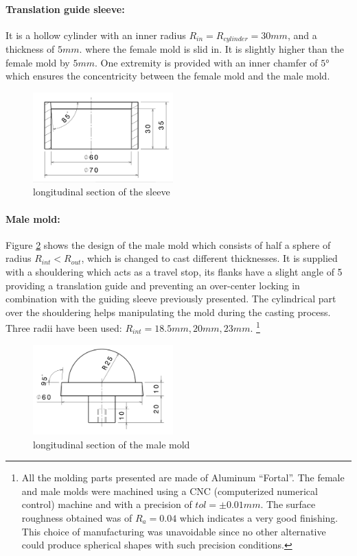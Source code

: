 \paragraph{Translation guide sleeve:}
It is a hollow cylinder with an inner radius $R_{in} = R_{cylinder} = 30 mm$, and a thickness of $5 mm$. where the female mold is slid in. It is slightly higher than the female mold by $5 mm$. One extremity is provided with an inner chamfer of $5°$ which ensures the concentricity between the female mold and the male mold.
\begin{figure}[H] %
	\centering%
  \includegraphics[width=0.48\textwidth]{figures/Chapter_1/sleeve_translation.jpg}
  \caption{longitudinal section of the sleeve}%
	\label{fig:sleeve_1}%
\end{figure}

\paragraph{Male mold:}
Figure \ref{fig:male_mold} shows the design of the male mold which consists of half a sphere of radius $R_{int}<R_{out}$, which is changed to cast different thicknesses. It is supplied with a shouldering which acts as a travel stop, its flanks have a slight angle of 5 providing a translation guide and preventing an over-center locking in combination with the guiding sleeve previously presented. The cylindrical part over the shouldering helps manipulating the mold during the casting process. Three radii have been used: $R_{int} = 18.5 mm, 20 mm, 23 mm$. 
\footnote{All the molding parts presented are made of Aluminum "`Fortal"'. The female and male molds were machined using a CNC (computerized numerical control)  machine and with a precision of $tol =\pm 0.01 mm$. The surface roughness obtained was of $R_a = 0.04$ which indicates a very good finishing.
This choice of manufacturing was unavoidable since no other alternative could produce spherical shapes with such precision conditions.}
\begin{figure}[H] %
	\centering%
  \includegraphics[width=0.48\textwidth]{figures/Chapter_1/male_mold.jpg}
	\caption{longitudinal section of the male mold}
	\label{fig:male_mold}
\end{figure}

